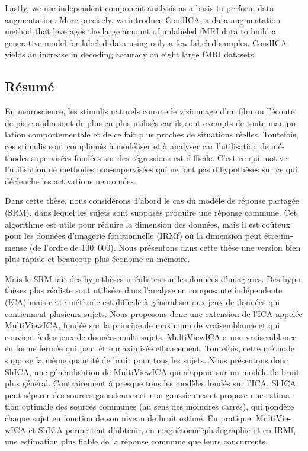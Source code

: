 Lastly, we use independent component analysis as a basis to perform data
augmentation.  More precisely, we introduce CondICA, a data augmentation method
that leverages the large amount of unlabeled fMRI data to build a generative
model for labeled data using only a few labeled samples. CondICA yields an
increase in decoding accuracy on eight large fMRI datasets.

\pagebreak 

\begin{otherlanguage}{french}
\chapter*{Résumé}
En neuroscience, les stimulis naturels comme le visionnage d'un film ou
l'écoute de piste audio sont de plus en plus utilisés car ils sont exempts de
toute manipulation comportementale et de ce fait plus proches de situations réelles. 
Toutefois, ces stimulis sont compliqués à modéliser et à analyser car l'utilisation de
méthodes supervisées fondées sur des régressions est difficile.
C'est ce qui motive l'utilisation de methodes non-supervisées qui ne font pas
d'hypothèses sur ce qui déclenche les activations neuronales.

Dans cette thèse, nous considérons d'abord le cas du modèle de réponse partagée (SRM), dans lequel
les sujets sont supposés produire une réponse commune. Cet algorithme est utile pour
réduire la dimension des données, mais il est coûteux pour les données
d'imagerie fonctionnelle (IRMf) où la dimension peut être immense (de l'ordre
de 100~000).
Nous présentons dans cette thèse une version bien plus rapide et beaucoup plus
économe en mémoire.

Mais le SRM fait des hypothèses irréalistes sur les données d'imageries. Des
hypothèses plus réaliste sont utilisées dans l'analyse en composante
indépendente (ICA) mais cette méthode est difficile à généraliser aux jeux de
données qui contiennent plusieurs sujets. Nous proposons donc une extension de
l'ICA  appelée MultiViewICA, fondée sur la principe de maximum de vraisemblance
et qui convient à des jeux de données multi-sujets.
MultiViewICA a une vraisemblance en forme fermée qui peut être maximisée
efficacement. Toutefois, cette méthode suppose la même quantité de bruit pour tous les sujets.
Nous présentons donc ShICA, une généralisation de MultiViewICA qui s'appuie sur un modèle de bruit plus général.
Contrairement à presque tous les modèles fondés sur l'ICA, ShICA peut
séparer des sources gaussiennes et non gaussiennes et propose une estimation
optimale des sources communes (au sens des moindres carrés), qui pondère chaque
sujet en fonction de son niveau de bruit estimé.
En pratique, MultiViewICA et ShICA permettent d'obtenir, en magnétoencéphalographie et en IRMf, une estimation plus fiable de la réponse commune que leurs concurrents.


\end{otherlanguage}
